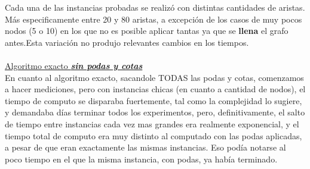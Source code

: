 \documentclass[10pt,a4paper]{article}
\begin{document}
Cada una de las instancias probadas se realizó con distintas cantidades de aristas. Más especificamente entre 20 y 80 aristas, a excepción de los casos de muy pocos nodos (5 o 10) en los que no es posible aplicar tantas ya que se \textbf{llena} el grafo antes.Esta variación no produjo relevantes cambios en los tiempos.\\ \\

\underline{Algoritmo exacto \textit{\textbf{sin podas y cotas}}}\\
En cuanto al algoritmo exacto, sacandole TODAS las podas y cotas, comenzamos a hacer mediciones, pero con instancias chicas (en cuanto a cantidad de nodos), el tiempo de computo se disparaba fuertemente, tal como la complejidad lo sugiere, y demandaba días terminar todos los experimentos, pero, definitivamente, el salto de tiempo entre instancias cada vez mas grandes era realmente exponencial, y el tiempo total de computo era muy distinto al computado con las podas aplicadas, a pesar de que eran exactamente las mismas instancias. Eso podía notarse al poco tiempo en el que la misma instancia, con podas, ya había terminado.
\end{document}
